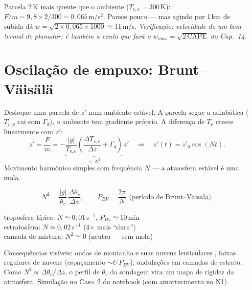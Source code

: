 \documentclass[11pt]{article}
\begin{document}
\begin{exemplo}
Parcela $2$\,K mais quente que o ambiente ($T_{v,e} = 300$\,K):
$F/m = 9{,}8\times2/300 = 0{,}065$\,m/s$^2$. Parece pouco — mas agindo
por 1\,km de subida dá
$w = \sqrt{2\times0{,}065\times1000} \simeq 11$\,m/s.
\emph{Verificação: velocidade de um bom termal de planador; é também a
conta que fará o $w_{max} = \sqrt{2\,\mathrm{CAPE}}$ do Cap.~14.}
\end{exemplo}

\section{Oscilação de empuxo: Brunt--Väisälä}\label{sec:bv}


\begin{formadif}[dedução]
Desloque uma parcela de $z'$ num ambiente estável. A parcela segue a
adiabática ($T_{v,p}$ cai com $\Gamma_d$), o ambiente tem gradiente
próprio. A diferença de $T_v$ cresce linearmente com $z'$:
\[ \ddot{z}' = \frac{F}{m} = -\underbrace{\frac{|g|}{T_{v,e}}
   \left(\frac{\Delta T_{v,e}}{\Delta z} + \Gamma_d\right)}_{\equiv\,N^2}\,z'
\quad\Longrightarrow\quad z'(t) = z'_0\cos(Nt). \]
Movimento harmônico simples com frequência $N$ — a atmosfera estável é
uma mola.
\end{formadif}

\begin{formalivro}
\[ N^2 = \frac{|g|}{\theta_v}\,\frac{\Delta\theta_v}{\Delta z}, \qquad
   P_{BV} = \frac{2\pi}{N}\ \ \text{(período de Brunt--Väisälä)}. \]
\end{formalivro}

\begin{noquadro}
troposfera típica: $N \simeq 0{,}01$\,s$^{-1}$, $P_{BV} \simeq 10$\,min\\
estratosfera: $N \simeq 0{,}02$\,s$^{-1}$ (4$\times$ mais ``dura'')\\
camada de mistura: $N^2 \simeq 0$ (neutra — sem mola)
\end{noquadro}

Consequências visíveis: ondas de montanha e suas nuvens lenticulares
, faixas regulares de nuvens (espaçamento
$\sim U\,P_{BV}$), ondulações em camadas de estrato. Como $N^2 \propto
\Delta\theta_v/\Delta z$, o perfil de $\theta_v$ da sondagem
 vira um mapa de rigidez da atmosfera.
Simulação no Caso~2 do notebook (com amortecimento no N1).
\end{document}
